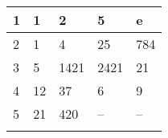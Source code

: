 \begin{table}[htbp]
\centering
\begin{tabular}{lllll}
\hline

1 & 1   & 2    & 5    & e     \\ \hline
2 & 1   & 4    & 25   & 784   \\ \hline
3 & 5   & 1421 & 2421 & 21    \\ \hline
4 & 12  & 37   & 6    & 9     \\ \hline
5 & 21  & 420  &  --  &  --   \\ \hline
  &     &      &      &       \\ 
\end{tabular}
\end{table}